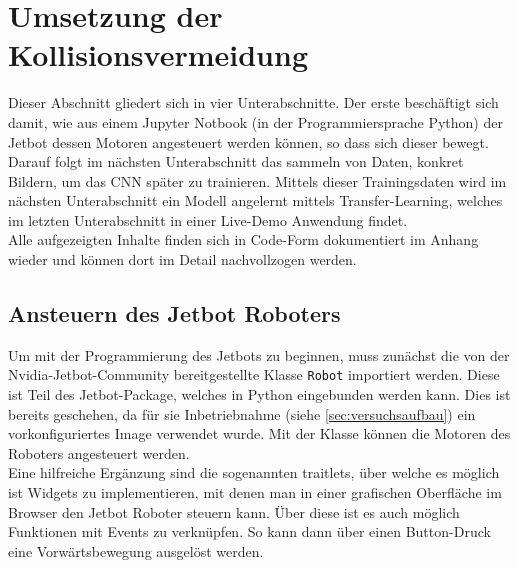 \section{Umsetzung der Kollisionsvermeidung} \label{sec:durchführung}

Dieser Abschnitt gliedert sich in vier Unterabschnitte. Der erste beschäftigt sich damit, wie aus einem Jupyter Notbook (in der Programmiersprache Python) der Jetbot \bzw dessen Motoren angesteuert werden können, so dass sich dieser bewegt. Darauf folgt im nächsten Unterabschnitt das sammeln von Daten, konkret Bildern, um das CNN später zu trainieren. Mittels dieser Trainingsdaten wird im nächsten Unterabschnitt ein Modell angelernt mittels Transfer-Learning, welches im letzten Unterabschnitt in einer Live-Demo Anwendung findet.\\

Alle aufgezeigten Inhalte finden sich in Code-Form dokumentiert im Anhang wieder und können dort im Detail nachvollzogen werden.

\subsection{Ansteuern des Jetbot Roboters} \label{sec:steuern-robot}

Um mit der Programmierung des Jetbots zu beginnen, muss zunächst die von der Nvidia-Jetbot-Community bereitgestellte Klasse \glqq\texttt{Robot}\grqq{} importiert werden. Diese ist Teil des Jetbot-Package, welches in Python eingebunden werden kann. Dies ist bereits geschehen, da für sie Inbetriebnahme (siehe \autoref{sec:versuchsaufbau}) ein vorkonfiguriertes Image verwendet wurde. Mit der Klasse können die Motoren des Roboters angesteuert werden. \\
Eine hilfreiche Ergänzung sind die sogenannten \glqq traitlets\grqq{}, über welche es möglich ist Widgets zu implementieren, mit denen man in einer grafischen Oberfläche im Browser den Jetbot Roboter steuern kann. Über diese ist es auch möglich Funktionen mit Events zu verknüpfen. So kann dann \zB über einen Button-Druck eine Vorwärtsbewegung ausgelöst werden.\\

